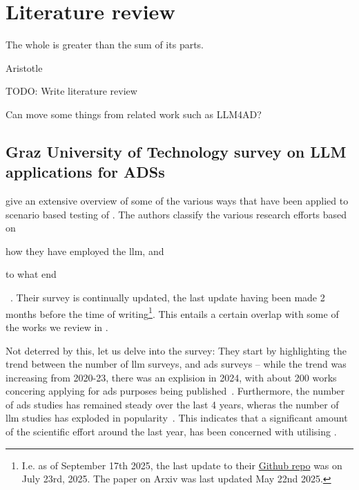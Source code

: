 \chapter{Literature review}\label{chp:literatureReview}

\epigraph{The whole is greater than the sum of its parts.}{Aristotle}

TODO: Write literature review

Can move some things from related work such as LLM4AD?

\section{Graz University of Technology survey on LLM applications for ADSs} %

\citeauthor{surveyLLMScenarioBasedTesting} give an extensive overview of some of the various ways
that  have been applied to scenario based testing of .
The authors classify the various research efforts based on \begin{inparaenum}
    \item how they have employed the \acrshort{llm}, and
    \item to what end
\end{inparaenum}~\cite{surveyLLMScenarioBasedTesting}.
Their survey is continually updated, the last update having been made 2 months before the time of
writing\footnote{I.e. as of September 17th 2025, the last update to their
    \href{https://github.com/ftgTUGraz/LLM4ADSTest}{Github repo} was on July 23rd, 2025. The paper on
    Arxiv was last updated May 22nd 2025.}. This entails a certain overlap with some of the works we
review in .

Not deterred by this, let us delve into the survey:
They start by highlighting the trend between the number of \acrshort{llm} surveys, and
\acrshort{ads} surveys -- while the trend was increasing from 2020-23, there was an explision in
\num{2024}, with about \num{200} works concering applying  for \acrlong{ads}
purposes being published~\cite[p. 1, figure (b)]{surveyLLMScenarioBasedTesting}. Furthermore, the
number of \acrshort{ads} studies has remained steady over the last \num{4}  years, wheras the number
of \acrshort{llm} studies has exploded in popularity~\cite[p. 1, figure
    (a)]{surveyLLMScenarioBasedTesting}. This indicates that a significant amount of the scientific
effort around  the last year, has been concerned with utilising .

